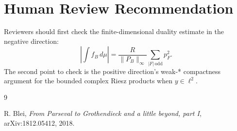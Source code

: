 \documentclass[11pt]{article}
\begin{document}
\section*{Human Review Recommendation}

Reviewers should first check the finite-dimensional duality estimate in the
negative direction:
\[
  \left|\int f_B\,d\mu\right|
  =
  \frac{R}{\|P_B\|_\infty}\sum_{|F|\ \mathrm{odd}}p_F^2.
\]
The second point to check is the positive direction's weak-* compactness
argument for the bounded complex Riesz products when \(y\in\ell^2\).

\begin{thebibliography}{9}

R. Blei,
\emph{From Parseval to Grothendieck and a little beyond, part I},
arXiv:1812.05412, 2018.

\end{thebibliography}
\end{document}
